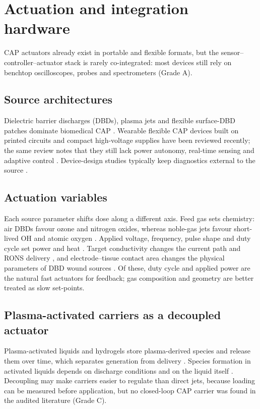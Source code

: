 \documentclass[preprint,review,12pt,authoryear]{elsarticle}
\begin{document}
\section{Actuation and integration hardware}
\label{sec:hardware}

CAP actuators already exist in portable and flexible formats, but the sensor--controller--actuator stack is rarely co-integrated: most devices still rely on benchtop oscilloscopes, probes and spectrometers (Grade A).

\subsection{Source architectures}

Dielectric barrier discharges (DBDs), plasma jets and flexible surface-DBD patches dominate biomedical CAP \citep{lu2021,emmert2013}. Wearable flexible CAP devices built on printed circuits and compact high-voltage supplies have been reviewed recently; the same review notes that they still lack power autonomy, real-time sensing and adaptive control \citep{zhang2026}. Device-design studies typically keep diagnostics external to the source \citep{quintero2025}.

\subsection{Actuation variables}

Each source parameter shifts dose along a different axis. Feed gas sets chemistry: air DBDs favour ozone and nitrogen oxides, whereas noble-gas jets favour short-lived OH and atomic oxygen \citep{machala2007,lu2021}. Applied voltage, frequency, pulse shape and duty cycle set power and heat \citep{kimyw2003}. Target conductivity changes the current path and RONS delivery \citep{miebach2022}, and electrode--tissue contact area changes the physical parameters of DBD wound sources \citep{borchardt2025}. Of these, duty cycle and applied power are the natural fast actuators for feedback; gas composition and geometry are better treated as slow set-points.

\subsection{Plasma-activated carriers as a decoupled actuator}

Plasma-activated liquids and hydrogels store plasma-derived species and release them over time, which separates generation from delivery \citep{biazar2024,kuddushi2026}. Species formation in activated liquids depends on discharge conditions and on the liquid itself \citep{bae2026}. Decoupling may make carriers easier to regulate than direct jets, because loading can be measured before application, but no closed-loop CAP carrier was found in the audited literature (Grade C).
\end{document}
